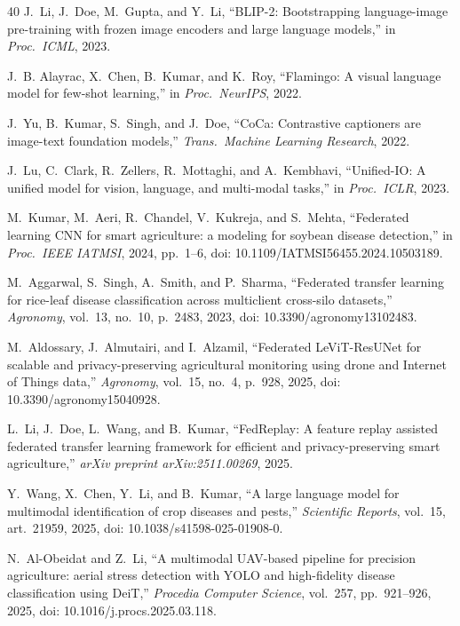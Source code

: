 \documentclass[12pt, a4paper, oneside]{Thesis}
\begin{document}
\begin{thebibliography}{40}
J.~Li, J.~Doe, M.~Gupta, and Y.~Li,
``BLIP-2: Bootstrapping language-image pre-training with frozen image encoders
and large language models,''
in \emph{Proc.\ ICML}, 2023.

J.~B. Alayrac, X.~Chen, B.~Kumar, and K.~Roy,
``Flamingo: A visual language model for few-shot learning,''
in \emph{Proc.\ NeurIPS}, 2022.

J.~Yu, B.~Kumar, S.~Singh, and J.~Doe,
``CoCa: Contrastive captioners are image-text foundation models,''
\emph{Trans.\ Machine Learning Research}, 2022.

J.~Lu, C.~Clark, R.~Zellers, R.~Mottaghi, and A.~Kembhavi,
``Unified-IO: A unified model for vision, language, and multi-modal tasks,''
in \emph{Proc.\ ICLR}, 2023.

M.~Kumar, M.~Aeri, R.~Chandel, V.~Kukreja, and S.~Mehta,
``Federated learning {CNN} for smart agriculture: a modeling for soybean disease detection,''
in \emph{Proc.\ IEEE IATMSI}, 2024, pp.\ 1--6,
doi: 10.1109/IATMSI56455.2024.10503189.

M.~Aggarwal, S.~Singh, A.~Smith, and P.~Sharma,
``Federated transfer learning for rice-leaf disease classification across multiclient
cross-silo datasets,''
\emph{Agronomy}, vol.~13, no.~10, p.~2483, 2023,
doi: 10.3390/agronomy13102483.

M.~Aldossary, J.~Almutairi, and I.~Alzamil,
``Federated {LeViT-ResUNet} for scalable and privacy-preserving agricultural monitoring
using drone and Internet of Things data,''
\emph{Agronomy}, vol.~15, no.~4, p.~928, 2025,
doi: 10.3390/agronomy15040928.

L.~Li, J.~Doe, L.~Wang, and B.~Kumar,
``{FedReplay}: A feature replay assisted federated transfer learning framework
for efficient and privacy-preserving smart agriculture,''
\emph{arXiv preprint arXiv:2511.00269}, 2025.

Y.~Wang, X.~Chen, Y.~Li, and B.~Kumar,
``A large language model for multimodal identification of crop diseases and pests,''
\emph{Scientific Reports}, vol.~15, art.\ 21959, 2025,
doi: 10.1038/s41598-025-01908-0.

N.~Al-Obeidat and Z.~Li,
``A multimodal {UAV}-based pipeline for precision agriculture: aerial stress
detection with {YOLO} and high-fidelity disease classification using {DeiT},''
\emph{Procedia Computer Science}, vol.~257, pp.\ 921--926, 2025,
doi: 10.1016/j.procs.2025.03.118.


\end{thebibliography}
\end{document}
